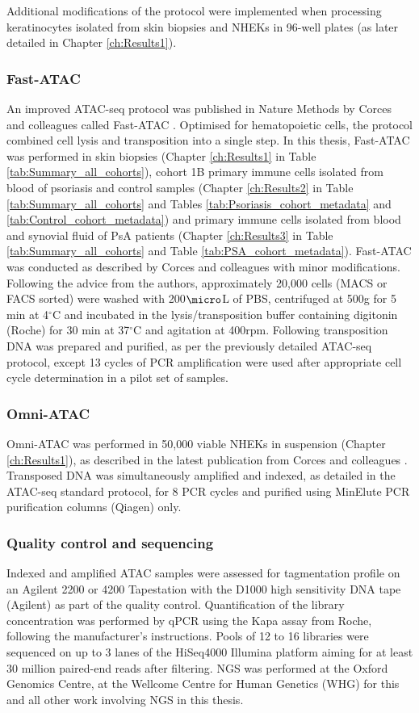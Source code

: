 Additional modifications of the protocol were implemented when processing keratinocytes isolated from skin biopsies and NHEKs in 96-well plates \parencite{Bao2015} (as later detailed in Chapter \ref{ch:Results1}).

\subsubsection{Fast-ATAC}
An improved ATAC-seq protocol was published in Nature Methods by Corces and colleagues called Fast-ATAC \parencite{Corces2016}. Optimised for hematopoietic cells, the protocol combined cell lysis and transposition into a single step. In this thesis, Fast-ATAC was performed in skin biopsies (Chapter \ref{ch:Results1} in Table \ref{tab:Summary_all_cohorts}), cohort 1B primary immune cells isolated from blood of psoriasis and control samples (Chapter \ref{ch:Results2} in Table \ref{tab:Summary_all_cohorts} and Tables \ref{tab:Psoriasis_cohort_metadata} and \ref{tab:Control_cohort_metadata}) and primary immune cells isolated from blood and synovial fluid of PsA patients (Chapter \ref{ch:Results3} in Table \ref{tab:Summary_all_cohorts} and Table \ref{tab:PSA_cohort_metadata}). Fast-ATAC was conducted as described by Corces and colleagues with minor modifications. Following the advice from the authors, approximately 20,000 cells (MACS or FACS sorted) were washed with 200$\micro$L of PBS, centrifuged at 500g for 5 min at 4$^\circ$C and incubated in the lysis/transposition buffer containing digitonin (Roche) for 30 min at 37{$^\circ$}C and agitation at 400rpm. Following transposition DNA was prepared and purified, as per the previously detailed ATAC-seq protocol, except 13 cycles of PCR amplification were used after appropriate cell cycle determination in a pilot set of samples.

\subsubsection{Omni-ATAC}
Omni-ATAC was performed in 50,000 viable NHEKs in suspension (Chapter \ref{ch:Results1}), as described in the latest publication from Corces and colleagues \parencite{Corces2017}. Transposed DNA was simultaneously amplified and indexed, as detailed in the ATAC-seq standard protocol, for 8 PCR cycles and purified using MinElute PCR purification columns (Qiagen) only. 


\subsubsection{Quality control and sequencing}
Indexed and amplified ATAC samples were assessed for tagmentation profile on an Agilent 2200 or 4200 Tapestation with the D1000 high sensitivity DNA tape (Agilent) as part of the quality control. Quantification of the library concentration was performed by qPCR using the Kapa assay from Roche, following the manufacturer's instructions. Pools of 12 to 16 libraries were sequenced on up to 3 lanes of the HiSeq4000 Illumina platform  aiming for at least 30 million paired-end reads after filtering. NGS was performed at the Oxford Genomics Centre, at the Wellcome Centre for Human Genetics (WHG) for this and all other work involving NGS in this thesis.


